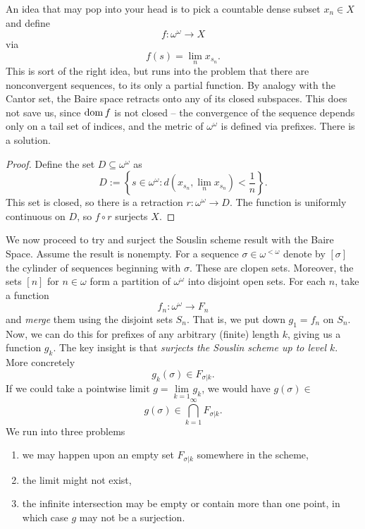 An idea that may pop into your head is to pick a countable dense subset \( x_n \in X \) and define
\[ 
    f: \omega^\omega \to X 
\]
via
\[ 
    f(s) = \lim_n x_{s_n}. 
\]
This is sort of the right idea, but runs into the problem that there are nonconvergent sequences, to its only a partial function. By analogy with the Cantor set, the Baire space retracts onto any of its closed subspaces. This does not save us, since \( \operatorname{dom} f \) is not closed -- the convergence of the sequence depends only on a tail set of indices, and the metric of \( \omega^\omega \) is defined via prefixes. There is a solution.

\begin{proof}
    Define the set \( D \subseteq \omega^\omega \) as
    \[ 
        D := \left\{ s \in \omega^\omega : d(x_{s_n}, \lim_n x_{s_n}) < \frac{1}{n} \right\}.
   \]
   This set is closed, so there is a retraction \( r: \omega^{ \omega } \to D\). The function is uniformly continuous on \( D \), so \( f \circ r \) surjects \( X \).
\end{proof}

We now proceed to try and surject the Souslin scheme result with the Baire Space. Assume the result is nonempty.
For a sequence \( \sigma \in \omega^{ < \omega } \) denote by \( [ \sigma ] \) the cylinder of sequences beginning with \( \sigma \). These are clopen sets. Moreover, the sets \( [ n ] \) for \( n \in \omega \) form a partition of \( \omega^{ \omega } \) into disjoint open sets. For each \( n \), take a function
\[ 
    f_n : \omega^\omega \to F_n 
\]
and \emph{merge} them using the disjoint sets \( S_n \). That is, we put down \( g_1 = f_n \) on \( S_n \).
Now, we can do this for prefixes of any arbitrary (finite) length \( k \), giving us a function \( g_k \). The key insight is that \emph{surjects the Souslin scheme up to level \( k \)}. More concretely
\[ 
    g_k( \sigma ) \in F_{\sigma|k}.
\]
If we could take a pointwise limit \( g = \lim\limits_{k=1} g_k \), we would have \( g(\sigma) \in \)
\[ 
    g( \sigma ) \in \bigcap_{k=1}^\infty F_{\sigma | k}. 
\]
We run into three problems
\begin{enumerate}
    \item we may happen upon an empty set \( F_{\sigma | k} \) somewhere in the scheme,
    \item the limit might not exist,
    \item the infinite intersection may be empty or contain more than one point, in which case \( g \) may not be a surjection.
\end{enumerate}

